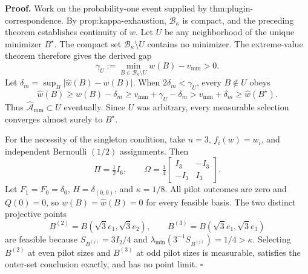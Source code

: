 \textbf{Proof.}
Work on the probability-one event supplied by thm:plugin-correspondence.  By prop:kappa-exhaustion, \(\mathcal B_\kappa\) is compact, and the preceding theorem establishes continuity of \(w\).  Let \(U\) be any neighborhood of the unique minimizer \(B^\star\).  The compact set \(\mathcal B_\kappa\setminus U\) contains no minimizer.  The extreme-value theorem therefore gives the derived gap
\[
 \gamma_U:=\min_{B\in\mathcal B_\kappa\setminus U}w(B)-v_{\mathrm{mm}}>0. \tag{1}
\]
Let \(\delta_m=\sup_B\lvert\widehat w(B)-w(B)\rvert\).  When \(2\delta_m<\gamma_U\), every \(B\notin U\) obeys
\[
 \widehat w(B)\ge w(B)-\delta_m
 \ge v_{\mathrm{mm}}+\gamma_U-\delta_m
 >v_{\mathrm{mm}}+\delta_m
 \ge\widehat w(B^\star).
\]
Thus \(\widehat{\mathcal A}_{\mathrm{mm}}\subset U\) eventually.  Since \(U\) was arbitrary, every measurable selection converges almost surely to \(B^\star\).

For the necessity of the singleton condition, take \(n=3\), \(f_i(w)=w_i\), and independent Bernoulli \((1/2)\) assignments.  Then
\[
 \Pi=\tfrac12I_6,
 \qquad \Omega=\tfrac14\begin{bmatrix}I_3&-I_3\\-I_3&I_3\end{bmatrix}.
\]
Let \(F_1=F_0=\delta_0\), \(H=\delta_{(0,0)}\), and \(\kappa=1/8\).  All pilot outcomes are zero and \(Q(0)=0\), so \(w(B)=\widehat w(B)=0\) for every feasible basis.  The two distinct projective points
\[
 B^{(2)}=B(\sqrt3e_1,\sqrt3e_2),
 \qquad B^{(3)}=B(\sqrt3e_1,\sqrt3e_3)
\]
are feasible because \(S_{B^{(j)}}=3I_2/4\) and \(\lambda_{\min}(3^{-1}S_{B^{(j)}})=1/4>\kappa\).  Selecting \(B^{(2)}\) at even pilot sizes and \(B^{(3)}\) at odd pilot sizes is measurable, satisfies the outer-set conclusion exactly, and has no point limit. \(\square\)